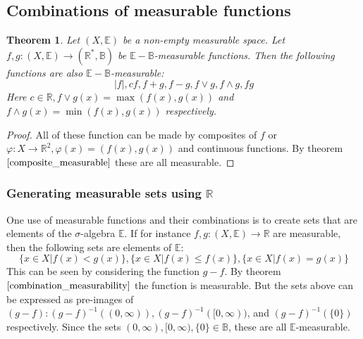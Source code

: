 \documentclass[12pt, a4paper]{article}
\newtheorem{theorem}{Theorem}[section]
\numberwithin{equation}{section}
\begin{document}
\subsection{Combinations of measurable functions}
\begin{theorem}
\label{combination_measurability}
Let $(X,\mathbb{E})$ be a non-empty measurable space. Let $f, g: (X,\mathbb{E})\rightarrow(\mathbb{R}^*,\mathbb{B})$ be $\mathbb{E}-\mathbb{B}$-measurable functions. Then the following functions are also $\mathbb{E}-\mathbb{B}$-measurable:
\begin{equation}
|f|, cf, f+g, f-g, f\vee g, f\wedge g, fg 
\end{equation}
Here $c\in\mathbb{R}, f\vee g(x)=\max(f(x),g(x))$ and $f\wedge g(x)=\min(f(x),g(x))$ respectively.
\end{theorem}
\begin{proof}
All of these function can be made by composites of $f$ or $\varphi: X\rightarrow\mathbb{R}^2, \varphi(x)=(f(x), g(x))$ and continuous functions. By theorem $\ref{composite_measurable}$ these are all measurable.
\end{proof}

\subsubsection{Generating measurable sets using $\mathbb{R}$}

One use of measurable functions and their combinations is to create sets that are elements of the $\sigma$-algebra $\mathbb{E}$. If for instance $f, g: (X,\mathbb{E})\rightarrow\mathbb{R}$ are measurable, then the following sets are elements of $\mathbb{E}$:
\begin{equation}
\{x\in X|f(x)<g(x)\}, \{x\in X|f(x)\le f(x)\}, \{x\in X|f(x)=g(x)\}
\end{equation}
This can be seen by considering the function $g-f$. By theorem $\ref{combination_measurability}$ the function is measurable. But the sets above can be expressed as pre-images of $(g-f): (g-f)^{-1}((0,\infty)), (g-f)^{-1}([0,\infty))$, and $(g-f)^{-1}(\{0\})$ respectively. Since the sets $(0,\infty), [0,\infty),\{0\}\in\mathbb{B}$, these are all $\mathbb{E}$-measurable.
\end{document}

